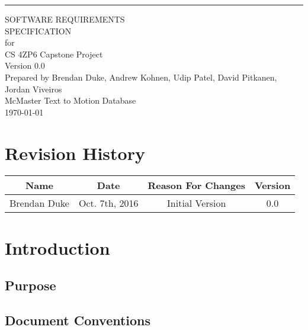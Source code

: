 \documentclass{scrreprt}
\date{}
\def\myversion{0.0 }
\begin{document}
\begin{flushright}
    \rule{16cm}{5pt}\vskip1cm
    \begin{bfseries}
        \Huge{SOFTWARE REQUIREMENTS\\ SPECIFICATION}\\
        \vspace{1.9cm}
        for\\
        \vspace{1.9cm}
        CS 4ZP6 Capstone Project\\
        \vspace{1.9cm}
        \LARGE{Version \myversion}\\
        \vspace{1.9cm}
        Prepared by Brendan Duke, Andrew Kohnen, Udip Patel, David Pitkanen, Jordan Viveiros\\
        \vspace{1.9cm}
        McMaster Text to Motion Database\\
        \vspace{1.9cm}
        \today\\
    \end{bfseries}
\end{flushright}

\tableofcontents


\chapter*{Revision History}

\begin{center}
    \begin{tabular}{|c|c|c|c|}
        \hline
	    Name & Date & Reason For Changes & Version\\
        \hline
	    Brendan Duke & Oct. 7th, 2016 & Initial Version & 0.0\\
        \hline
    \end{tabular}
\end{center}

\chapter{Introduction}

\section{Purpose}

\section{Document Conventions}
\end{document}
